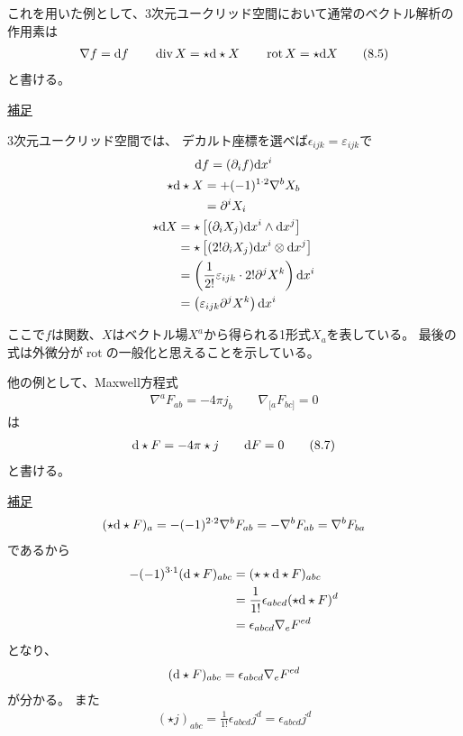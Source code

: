 \documentclass[a4paper, 12pt]{jsarticle}
\theoremstyle{definition}
\newcommand{\ddif}{{\rm d}}
\DeclareMathOperator{\Div}{div}
\DeclareMathOperator{\Rot}{rot}
\begin{document}
これを用いた例として、3次元ユークリッド空間において通常のベクトル解析の作用素は
\begin{align}
	\nabla f = \ddif f \qquad
	\Div X = \star \ddif \star X \qquad
	\Rot X = \star \ddif X
	\tag{8.5} \label{8.5}
\end{align}
と書ける。
\begin{screen}
	\underline{補足}

	3次元ユークリッド空間では、
	デカルト座標を選べば$\epsilon_{ijk} = \varepsilon_{ijk}$で
	\begin{gather}
		\ddif f = (\partial_i f) \ddif x^i \\
		\begin{aligned}
			\star \ddif \star X &= + (-1)^{1 \cdot 2} \nabla^b X_b \\
			&= \partial^i X_i
		\end{aligned} \\
		\begin{aligned}
			\star \ddif X &=
			\star \left[ (\partial_i X_j) \ddif x^i \wedge \ddif x^j\right] \\
			&= \star \left[ (2! \partial_i X_j)
			\ddif x^i \otimes \ddif x^j \right] \\
			&= \left( \frac{1}{2!} \varepsilon_{ijk} \cdot
			2! \partial^j X^k \right) \ddif x^i \\
			&= \left( \varepsilon_{ijk} \partial^j X^k \right) \ddif x^i
		\end{aligned}
	\end{gather}
\end{screen}
ここで$f$は関数、$X$はベクトル場$X^a$から得られる1形式$X_a$を表している。
最後の式は外微分が$\Rot$の一般化と思えることを示している。

他の例として、Maxwell方程式
\begin{align}
	\nabla^a F_{ab} = -4\pi j_b \qquad \nabla_{[a} F_{bc]} = 0
\end{align}
は
\begin{align}
	\ddif \star F = -4 \pi \star j \qquad
	\ddif F = 0
	\tag{8.7} \label{8.7}
\end{align}
と書ける。
\begin{screen}
	\underline{補足}
	\begin{align}
		(\star \ddif \star F)_a = - (-1)^{2 \cdot 2} \nabla^b F_{ab}
		= -\nabla^b F_{ab} = \nabla^b F_{ba}
	\end{align}
	であるから
	\begin{align}
		-(-1)^{3 \cdot 1} (\ddif \star F)_{abc}
		&= (\star \star \ddif \star F)_{abc} \\
		&= \frac{1}{1!} \epsilon_{abcd} (\star \ddif \star F)^d \\
		&= \epsilon_{abcd} \nabla_e F^{ed}
	\end{align}
	となり、
	\begin{align}
		(\ddif \star F)_{abc} = \epsilon_{abcd} \nabla_e F^{ed}
	\end{align}
	が分かる。
	また
	\begin{align}
		(\star j)_{abc} = \frac{1}{1!} \epsilon_{abcd} j^d
		= \epsilon_{abcd} j^d
	\end{align}
\end{screen}
\end{document}
